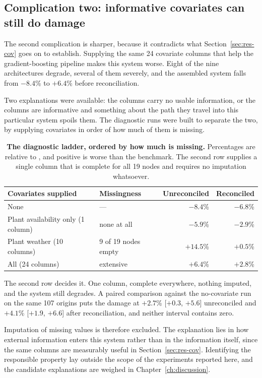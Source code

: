 \subsection{Complication two: informative covariates can still do damage}

The second complication is sharper, because it contradicts what
Section~\ref{sec:res-cov} goes on to establish. Supplying the same 24 covariate columns
that help the gradient-boosting pipeline makes this system worse. Eight of the nine
architectures degrade, several of them severely, and the assembled system falls from
$-8.4$\% to $+6.4$\% before reconciliation.

Two explanations were available: the columns carry no usable information, or the columns are
informative and something about the path they travel into this particular system spoils
them. The diagnostic runs were built to separate the two, by supplying covariates in order
of how much of them is missing.

\begin{table}[htp]
\centering
\begin{tabular}{llrr}
\toprule
{\bf Covariates supplied} & {\bf Missingness} & {\bf Unreconciled} & {\bf Reconciled} \\
\midrule
None & --- & $-8.4$\% & $-6.8$\% \\
Plant availability only (1 column) & none at all & $-5.9$\% & $-2.9$\% \\
Plant weather (10 columns) & 9 of 19 nodes empty & $+14.5$\% & $+0.5$\% \\
All (24 columns) & extensive & $+6.4$\% & $+2.8$\% \\
\bottomrule
\end{tabular}
\caption[Diagnostic ladder]{\textbf{The diagnostic ladder, ordered by how much is
missing.} Percentages are relative to \naiveA{}, and positive is worse than the benchmark.
The second row supplies a single column that is complete for all 19 nodes and requires no
imputation whatsoever.}
\label{tab:es-diag}
\end{table}

The second row decides it. One column, complete everywhere, nothing imputed, and the system
still degrades. A paired comparison against the no-covariate run on the same 107 origins
puts the damage at $+2.7$\% [$+0.3$, $+5.6$] unreconciled and $+4.1$\% [$+1.9$, $+6.6$]
after reconciliation, and neither interval contains zero.

Imputation of missing values is therefore excluded. The explanation lies in how external
information enters this system rather than in the information itself, since the same columns
are measurably useful in Section~\ref{sec:res-cov}. Identifying the responsible property
lay outside the scope of the experiments reported here, and the candidate explanations are
weighed in Chapter~\ref{ch:discussion}.

